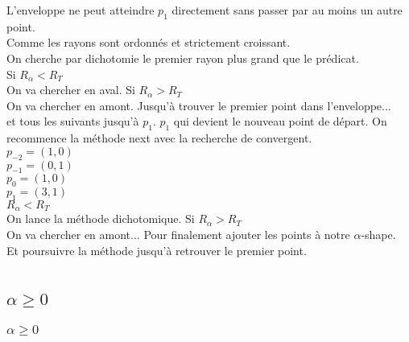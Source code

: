 \documentclass{beamer}
\begin{document}
\begin{frame}
\begin{columns}[t]
\begin{column}{3cm}
\begin{block}{}
{        }
        {
          L'enveloppe ne peut atteindre $p_{1}$ directement sans passer par au moins un autre point.\\
        }
        {
          Comme les rayons sont ordonnés et strictement croissant.\\
          On cherche par dichotomie le premier rayon plus grand que le prédicat.\\
        }        
        {
          Si $R_{\alpha} < R_T$\\
          On va chercher en aval.
        }
        {
          Si $R_{\alpha} > R_T$\\
          On va chercher en amont.
        }
        {
          Jusqu'à trouver le premier point dans l'enveloppe...\\          
        }
        {
          et tous les suivants jusqu'à $p_1$.     
        }
        {
          $p_1$ qui devient le nouveau point de départ.
        }
        {
          On recommence la méthode next avec la recherche de convergent.\\
          $p_{-2} = (1, 0)$\\
          $p_{-1} = (0, 1)$\\
          $p_{0} = (1, 0)$\\
          $p_{1} = (3, 1)$\\
        }
        {
          $R_{\alpha} < R_T$\\
          On lance la méthode dichotomique. 
        }
        {
          Si $R_{\alpha} > R_T$\\
          On va chercher en amont...
        }
        {
          Pour finalement ajouter les points à notre $\alpha$-shape.\\
        }
        {
          Et poursuivre la méthode jusqu'à retrouver le premier point.
        }        
      \end{block}     
    \end{column}
  \end{columns} 

 
\end{frame}

\subsection{$\alpha \geq 0$}
\begin{frame}
\frametitle{$\alpha \geq 0$}
\end{frame}
\end{document}
